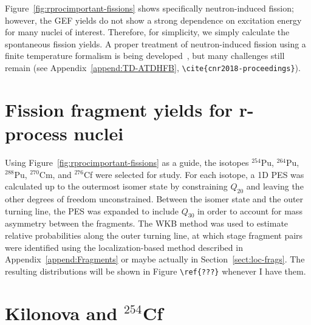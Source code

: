 Figure~\ref{fig:rprocimportant-fissions} shows specifically neutron-induced fission; however, the GEF yields do not show a strong dependence on excitation energy for many nuclei of interest. Therefore, for simplicity, we simply calculate the spontaneous fission yields. A proper treatment of neutron-induced fission using a finite temperature formalism is being developed~\cite{Mcdonnell2014, Schunck2014, Schunck2015b}, but many challenges still remain (see Appendix~\ref{append:TD-ATDHFB}, \verb|\cite{cnr2018-proceedings}|).


\section{Fission fragment yields for r-process nuclei}

Using Figure~\ref{fig:rprocimportant-fissions} as a guide, the isotopes $^{254}$Pu, $^{264}$Pu, $^{288}$Pu, $^{270}$Cm, and $^{276}$Cf were selected for study. For each isotope, a 1D PES was calculated up to the outermost isomer state by constraining $Q_{20}$ and leaving the other degrees of freedom unconstrained. Between the isomer state and the outer turning line, the PES was expanded to include $Q_{30}$ in order to account for mass asymmetry between the fragments. The WKB method was used to estimate relative probabilities along the outer turning line, at which stage fragment pairs were identified using the localization-based method described in Appendix~\ref{append:Fragments} or maybe actually in Section~\ref{sect:loc-frags}. The resulting distributions will be shown in Figure \verb|\ref{???}| whenever I have them.


\section{Kilonova and $^{254}$Cf}

